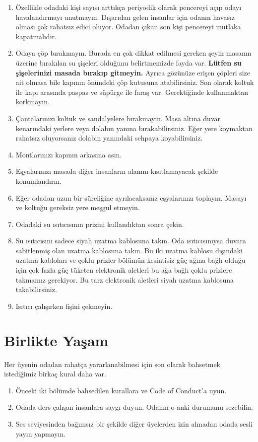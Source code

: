 \documentclass{article}
\begin{document}
\begin{enumerate}
	\item Özellikle odadaki kişi sayısı arttıkça periyodik olarak pencereyi
		açıp odayı havalandırmayı unutmayın. Dışarıdan gelen insanlar
		için odanın havasız olması çok rahatsız edici oluyor. Odadan
		çıkan son kişi pencereyi mutlaka kapatmalıdır.
	\item Odaya çöp bırakmayın. Burada en çok dikkat edilmesi gereken şeyin
		masanın üzerine bırakılan su şişeleri olduğunu belirtmemizde
		fayda var. \textbf{Lütfen su şişelerinizi masada bırakıp
		gitmeyin.} Ayrıca gözünüze erişen çöpleri size ait olmasa bile
		kapının önündeki çöp kutusuna atabilirsiniz. Son olarak koltuk
		ile kapı arasında paspas ve süpürge ile faraş var. Gerektiğinde
		kullanmaktan korkmayın.
	\item Çantalarınızı koltuk ve sandalyelere bırakmayın. Masa altına
		duvar kenarındaki yerlere veya dolabın yanına bırakabilirsiniz.
		Eğer yere koymaktan rahatsız oluyorsanız dolabın yanındaki
		sehpaya koyabilirsiniz.
	\item Montlarınızı kapının arkasına asın.
	\item Eşyalarınızı masada diğer insanların alanını kısıtlamayacak
		şekilde konumlandırın.
	\item Eğer odadan uzun bir süreliğine ayrılacaksanız eşyalarınızı
		toplayın. Masayı ve koltuğu gereksiz yere meşgul etmeyin.
	\item Odadaki su ısıtıcısının prizini kullandıktan sonra çekin.
	\item Su ısıtıcısını sadece siyah uzatma kablosuna takın. Oda ısıtıcısınıysa duvara sabitlenmiş olan uzatma kablosuna takın. Bu iki uzatma kablosu dışındaki uzatma kabloları ve çoklu prizler bölümün kesintisiz güç ağına bağlı olduğu için çok fazla güç tüketen elektronik aletleri bu ağa bağlı çoklu prizlere takmamız gerekiyor. Bu tarz elektronik aletleri siyah uzatma kablosuna takabilirsiniz.
	\item Isıtıcı çalışırken fişini çekmeyin.
\end{enumerate}

\section{Birlikte Yaşam}
Her üyenin odadan rahatça yararlanabilmesi için son olarak bahsetmek
istediğimiz birkaç kural daha var.
\begin{enumerate}
	\item Önceki iki bölümde bahsedilen kurallara ve Code of Conduct'a
		uyun.
	\item Odada ders çalışan insanlara saygı duyun. Odanın o anki durumunu
		sezebilin.
	\item Ses seviyesinden bağımsız bir şekilde diğer üyelerden izin
		almadan odada sesli yayın yapmayın.
\end{enumerate}
	
\end{document}
